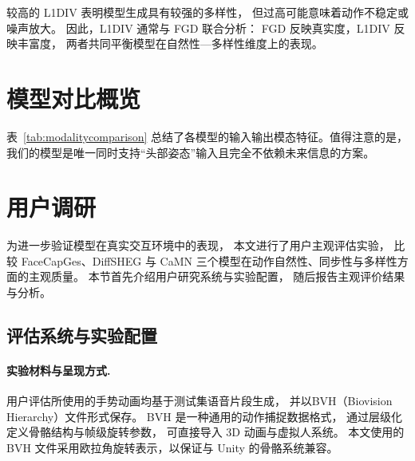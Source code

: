 较高的 L1DIV 表明模型生成具有较强的多样性，
但过高可能意味着动作不稳定或噪声放大。
因此，L1DIV 通常与 FGD 联合分析：  
FGD 反映真实度，L1DIV 反映丰富度，
两者共同平衡模型在自然性—多样性维度上的表现。

\section{模型对比概览}

表~\ref{tab:modalitycomparison} 总结了各模型的输入输出模态特征。值得注意的是，我们的模型是唯一同时支持“头部姿态”输入且完全不依赖未来信息的方案。

\begin{table}[h]
\centering
{}

\section{用户调研}
\label{sec:userstudy}

为进一步验证模型在真实交互环境中的表现，
本文进行了用户主观评估实验，
比较 FaceCapGes、DiffSHEG \cite{diffsheg} 与 CaMN \cite{beatcamn} 三个模型在动作自然性、同步性与多样性方面的主观质量。
本节首先介绍用户研究系统与实验配置，
随后报告主观评价结果与分析。

\subsection{评估系统与实验配置}

\paragraph{实验材料与呈现方式.}
用户评估所使用的手势动画均基于测试集语音片段生成，
并以BVH（Biovision Hierarchy）文件形式保存。
BVH 是一种通用的动作捕捉数据格式，
通过层级化定义骨骼结构与帧级旋转参数，
可直接导入 3D 动画与虚拟人系统。
本文使用的 BVH 文件采用欧拉角旋转表示，以保证与 Unity 的骨骼系统兼容。


\end{table}
